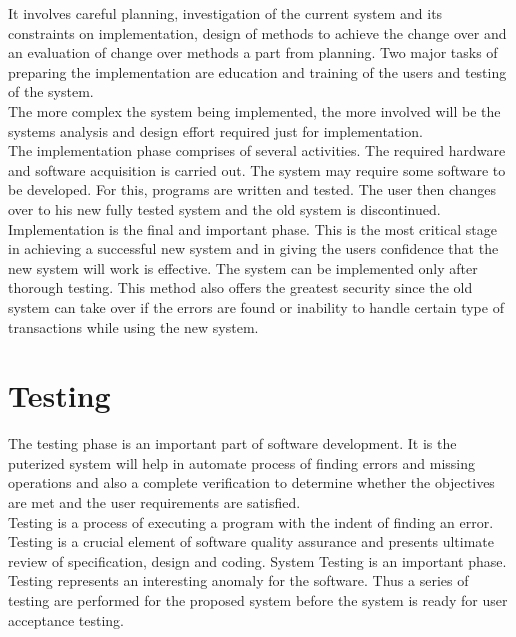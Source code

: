 \documentclass[12pt,a4 paper]{report}
\begin{document}
It involves careful planning, investigation of the current system and its constraints on implementation, design of methods to achieve the change over and an evaluation of change over methods a part from planning. Two major tasks of preparing the implementation are education and training of the users and testing of the system. \\

The more complex the system being implemented, the more involved will be the systems analysis and design effort required just for implementation. \\
                
The implementation phase comprises of several activities. The required hardware and software acquisition is carried out. The system may require some software to be developed. For this, programs are written and tested. The user then changes over to his new fully tested system and the old system is discontinued. \\

Implementation is the final and important phase. This is the most critical stage in achieving a successful new system and in giving the users confidence that the new system will work is effective. The system can be implemented only after thorough testing. This method also offers the greatest security since the old system can take over if the errors are found or inability to handle certain type of transactions while using the new system. \\


\chapter{Testing}
The testing phase is an important part of software development. It is the puterized system will help in automate  process of finding errors and missing operations and also a complete verification to determine whether the objectives are met and the user requirements are satisfied. \\

Testing is a process of executing a program with the indent of finding an error. Testing is a crucial element of software quality assurance and presents ultimate review of specification, design and coding. System Testing is an important phase. Testing represents an interesting anomaly for the software. Thus a series of testing are performed for the proposed system before the system is ready for user acceptance testing. \\
\end{document}
